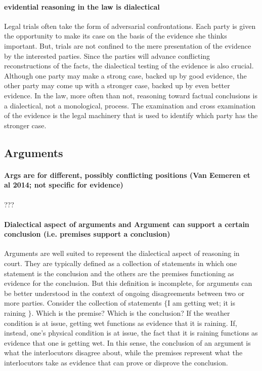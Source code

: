 \documentclass[10pt]{article}
\begin{document}
\paragraph{evidential reasoning in the law is dialectical} 

Legal trials often take the form of adversarial confrontations.  Each party is given the opportunity to make its case on the basis of the evidence she thinks important. But, 
trials are not confined to the mere presentation of the 
evidence by the interested parties. Since the parties will advance conflicting reconstructions of the facts, 
the dialectical testing of the evidence is also crucial. 
Although one party may make a strong case, backed up by good evidence, %
the other party may come up with a stronger case, backed up by even better evidence.  In the law, more often than not, reasoning toward factual 
conclusions is a dialectical, not a monological, process. The examination and cross examination of the evidence 
is the legal machinery that is used to identify which party has the stronger case.

\subsection{Arguments}


\paragraph{Args are for different, possibly conflicting positions (Van Eemeren et al 2014; not specific for evidence)}

???

\paragraph{Dialectical aspect of arguments and Argument can support a certain conclusion (i.e. premises support a conclusion)}

Arguments are well suited to represent the dialectical aspect of reasoning in court. They are 
typically defined as a collection of statements in which one statement is the conclusion and 
the others are the premises functioning as evidence for the conclusion. But this definition is incomplete, for arguments can be better understood in the context of ongoing disagreements 
between two or more parties. Consider the collection of statements $\{$I am getting wet; it is raining $\}$. Which is the premise? Which is the conclusion?  If the weather condition is at issue, getting wet functions as evidence that it is raining. If, instead, one's physical condition is at issue, the fact that it 
is raining functions as evidence that one is getting wet. In this sense, the conclusion of an argument is what the interlocutors disagree about, while the premises 
represent what the interlocutors take as evidence that can prove or disprove the conclusion. 
\end{document}
